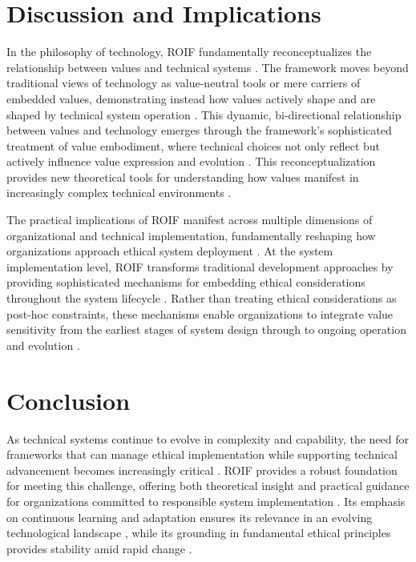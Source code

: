 \documentclass[12pt]{article}
\begin{document}
\section{Discussion and Implications}

In the philosophy of technology, ROIF fundamentally reconceptualizes the relationship between values and technical systems \parencite{verbeek2011}. The framework moves beyond traditional views of technology as value-neutral tools or mere carriers of embedded values, demonstrating instead how values actively shape and are shaped by technical system operation \parencite{winner1980}. This dynamic, bi-directional relationship between values and technology emerges through the framework's sophisticated treatment of value embodiment, where technical choices not only reflect but actively influence value expression and evolution \parencite{latour2005}. This reconceptualization provides new theoretical tools for understanding how values manifest in increasingly complex technical environments \parencite{vandepoel2013}.

The practical implications of ROIF manifest across multiple dimensions of organizational and technical implementation, fundamentally reshaping how organizations approach ethical system deployment \parencite{dignum2019}. At the system implementation level, ROIF transforms traditional development approaches by providing sophisticated mechanisms for embedding ethical considerations throughout the system lifecycle \parencite{friedman2008}. Rather than treating ethical considerations as post-hoc constraints, these mechanisms enable organizations to integrate value sensitivity from the earliest stages of system design through to ongoing operation and evolution \parencite{vandenhoven2013}.

\section{Conclusion}

As technical systems continue to evolve in complexity and capability, the need for frameworks that can manage ethical implementation while supporting technical advancement becomes increasingly critical \parencite{winner1980}. ROIF provides a robust foundation for meeting this challenge, offering both theoretical insight and practical guidance for organizations committed to responsible system implementation \parencite{orlikowski2007}. Its emphasis on continuous learning and adaptation ensures its relevance in an evolving technological landscape \parencite{argyris1978}, while its grounding in fundamental ethical principles provides stability amid rapid change \parencite{macintyre1981}.
\end{document}
